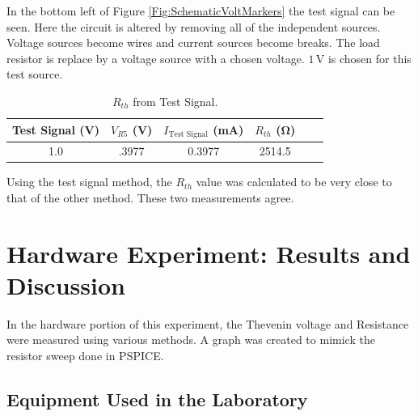 \documentclass[11pt]{article}
\begin{document}
In the bottom left of Figure \ref{Fig:SchematicVoltMarkers} the test signal can be seen. Here the circuit is altered by removing all of the independent sources. Voltage sources become wires and current sources become breaks. The load resistor is replace by a voltage source with a chosen voltage. $1\,\si\volt$ is chosen for this test source.

\begin{table}[h!]
	\centering
	\caption{$R_{th}$ from Test Signal.}
	\label{Table:Lab3ReqTestSignalPSPICE}
	\begin{tabular}{|c|c|c|c|c|c|}
		\hline
		Test Signal  (\si{\volt}) &$V_{R5}$ (\si{\volt}) & $I_{\mbox{Test Signal}}$ (\si{\milli\ampere}) & $R_{th}$ (\si{\ohm})\\
		\hline
		1.0 & .3977 & 0.3977 & 2514.5 \\	 \hline 
	\end{tabular}
\end{table}

Using the test signal method, the $R_{th}$ value was calculated to be very close to that of the other method. These two measurements agree.


\section{Hardware Experiment: Results and Discussion}

In the hardware portion of this experiment, the Thevenin voltage and Resistance were measured using various methods. A graph was created to mimick the resistor sweep done in PSPICE.

\subsection{Equipment Used in the Laboratory}
\end{document}
